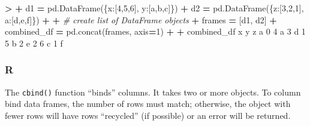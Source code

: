 \documentclass[
]{book}
\newenvironment{Shaded}{\begin{snugshade}}{\end{snugshade}}
\newcommand{\CommentTok}[1]{\textcolor[rgb]{0.56,0.35,0.01}{\textit{#1}}}
\newcommand{\DecValTok}[1]{\textcolor[rgb]{0.00,0.00,0.81}{#1}}
\newcommand{\NormalTok}[1]{#1}
\newcommand{\OperatorTok}[1]{\textcolor[rgb]{0.81,0.36,0.00}{\textbf{#1}}}
\newcommand{\StringTok}[1]{\textcolor[rgb]{0.31,0.60,0.02}{#1}}
\begin{document}
\begin{Shaded}
\begin{Highlighting}[]
\OperatorTok{\textgreater{}} 
\OperatorTok{+}\NormalTok{ d1 }\OperatorTok{=}\NormalTok{ pd.DataFrame(\{}\StringTok{\textquotesingle{}x\textquotesingle{}}\NormalTok{:[}\DecValTok{4}\NormalTok{,}\DecValTok{5}\NormalTok{,}\DecValTok{6}\NormalTok{], }\StringTok{\textquotesingle{}y\textquotesingle{}}\NormalTok{:[}\StringTok{\textquotesingle{}a\textquotesingle{}}\NormalTok{,}\StringTok{\textquotesingle{}b\textquotesingle{}}\NormalTok{,}\StringTok{\textquotesingle{}c\textquotesingle{}}\NormalTok{]\})}
\OperatorTok{+}\NormalTok{ d2 }\OperatorTok{=}\NormalTok{ pd.DataFrame(\{}\StringTok{\textquotesingle{}z\textquotesingle{}}\NormalTok{:[}\DecValTok{3}\NormalTok{,}\DecValTok{2}\NormalTok{,}\DecValTok{1}\NormalTok{], }\StringTok{\textquotesingle{}a\textquotesingle{}}\NormalTok{:[}\StringTok{\textquotesingle{}d\textquotesingle{}}\NormalTok{,}\StringTok{\textquotesingle{}e\textquotesingle{}}\NormalTok{,}\StringTok{\textquotesingle{}f\textquotesingle{}}\NormalTok{]\})}
\OperatorTok{+} 
\OperatorTok{+} \CommentTok{\# create list of DataFrame objects}
\OperatorTok{+}\NormalTok{ frames }\OperatorTok{=}\NormalTok{ [d1, d2]}
\OperatorTok{+}\NormalTok{ combined\_df }\OperatorTok{=}\NormalTok{ pd.concat(frames, axis}\OperatorTok{=}\DecValTok{1}\NormalTok{)}
\OperatorTok{+} 
\OperatorTok{+}\NormalTok{ combined\_df}
\NormalTok{   x  y  z  a}
\DecValTok{0}  \DecValTok{4}\NormalTok{  a  }\DecValTok{3}\NormalTok{  d}
\DecValTok{1}  \DecValTok{5}\NormalTok{  b  }\DecValTok{2}\NormalTok{  e}
\DecValTok{2}  \DecValTok{6}\NormalTok{  c  }\DecValTok{1}\NormalTok{  f}
\end{Highlighting}
\end{Shaded}

\hypertarget{r-31}{%
\subsubsection*{R}\label{r-31}}

The \texttt{cbind()} function ``binds'' columns. It takes two or more objects. To column bind data frames, the number of rows must match; otherwise, the object with fewer rows will have rows ``recycled'' (if possible) or an error will be returned.
\end{document}
